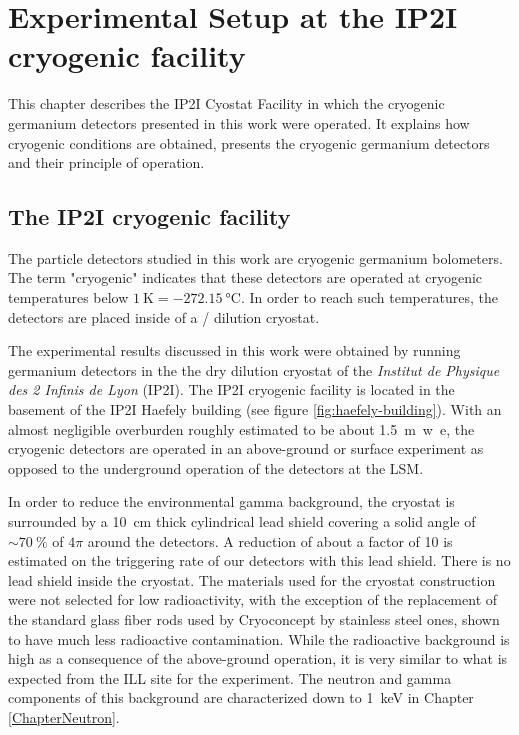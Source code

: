 
\chapter{Experimental Setup at the IP2I cryogenic facility} %

\label{ChapterExperiment} %


This chapter describes the IP2I Cyostat Facility in which the cryogenic germanium detectors presented in this work were operated. It explains how cryogenic conditions are obtained, presents the cryogenic germanium detectors and their principle of operation.

\section{The IP2I cryogenic facility}
\label{sec:IP2I-cryostat-facility} 

The particle detectors studied in this work are cryogenic germanium bolometers. The term "cryogenic" indicates that these detectors are operated at cryogenic temperatures below $\SI{1}{\kelvin} = \SI{-272,15}{\celsius}$. In order to reach such temperatures, the detectors are placed inside of a / dilution cryostat.

The experimental results discussed in this work were obtained by running germanium detectors in the the dry dilution cryostat of the \textit{Institut de Physique des 2 Infinis de Lyon} (IP2I). The IP2I cryogenic facility is located in the basement of the IP2I Haefely building (see figure \ref{fig:haefely-building}). With an almost negligible overburden roughly estimated to be about \SI{1.5}{m.w.e}, the cryogenic detectors are operated in an above-ground or surface experiment as opposed to the underground operation of the \Edelweiss{} detectors at the LSM.

In order to reduce the environmental gamma background, the cryostat is surrounded by a \SI{10}{\cm} thick cylindrical lead shield covering a solid angle of $\sim \SI{70}{\percent}$ of $4\pi$ around the detectors. A reduction of about a factor of 10 is estimated on the triggering rate of our detectors with this lead shield.
There is no lead shield inside the cryostat. The materials used for the cryostat construction were not selected for low radioactivity, with the exception of the replacement of the standard glass fiber rods used by Cryoconcept by stainless steel ones, shown to have much less radioactive contamination. 
While the radioactive background is high as a consequence of the above-ground operation, it is very similar to what is expected from the ILL site for the \Ricochet{} experiment. The neutron and gamma components of this background are characterized down to \SI{1}{\kilo\eV} in Chapter \ref{ChapterNeutron}.

